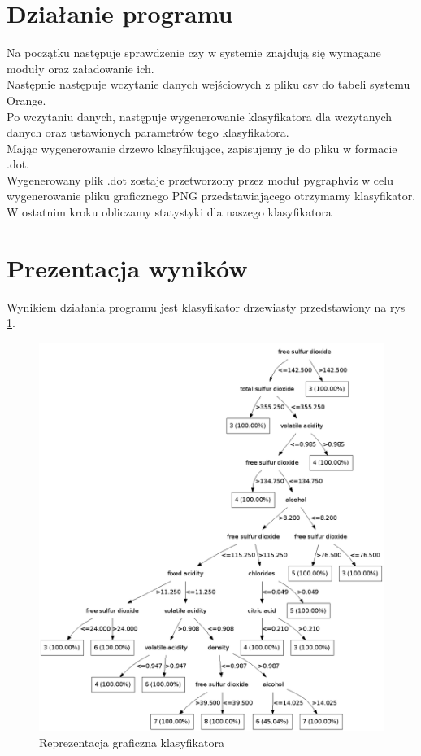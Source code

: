 \documentclass[a4paper,12pt]{article}
\begin{document}
\section{Działanie programu}
Na początku następuje sprawdzenie czy w systemie znajdują się wymagane moduły oraz załadowanie ich.\\
Następnie następuje wczytanie danych wejściowych z pliku csv do tabeli systemu Orange.\\
Po wczytaniu danych, następuje wygenerowanie klasyfikatora dla wczytanych danych oraz ustawionych parametrów tego klasyfikatora.\\
Mając wygenerowanie drzewo klasyfikujące, zapisujemy je do pliku w formacie .dot.\\
Wygenerowany plik .dot zostaje przetworzony przez moduł pygraphviz w celu wygenerowanie pliku graficznego PNG przedstawiającego otrzymamy klasyfikator.\\
W ostatnim kroku obliczamy statystyki dla naszego klasyfikatora
\section{Prezentacja wyników}
Wynikiem działania programu jest klasyfikator drzewiasty przedstawiony na rys \ref{fig:klasyfikator}.
\begin{figure}
\includegraphics[width=15cm]{FabrykowskiMarcin.png}
\caption{Reprezentacja graficzna klasyfikatora}
\label{fig:klasyfikator}
\end{figure}
\end{document}
